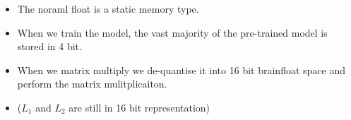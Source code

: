 \documentclass[11pt]{article}
\begin{document}
\begin{minipage}[l]{.5\linewidth}
    \begin{figure}[H]
        \centering
    \end{figure}    
\end{minipage}\hfill
\begin{minipage}[r]{.48\linewidth}
    \begin{itemize}
        \item The noraml float is a static memory type. 
        \item When we train the model, the vast majority of the pre-trained model is stored in 4 bit.
        \item When we matrix multiply we de-quantise it into 16 bit brainfloat space and perform the matrix mulitplicaiton.
        \item ($L_1$ and $L_2$ are still in 16 bit representation)
    \end{itemize}
\end{minipage}

\end{document}
